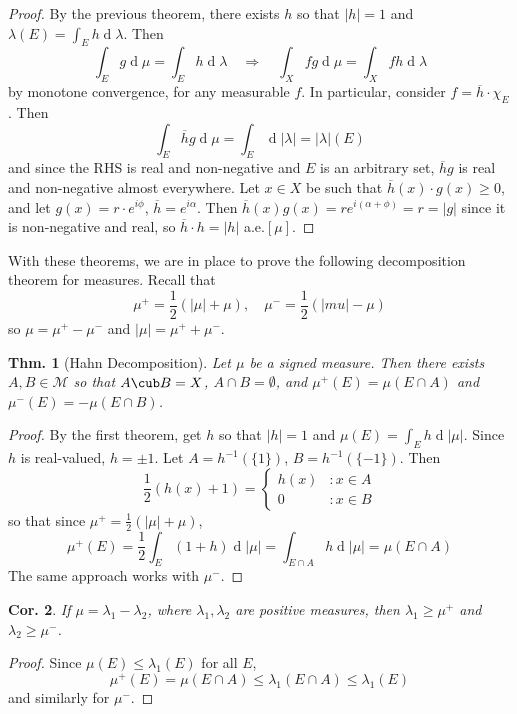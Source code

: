 \documentclass[12pt, a4paper]{book}
\renewcommand{\d}[1]{\ensuremath{\operatorname{d}\!{#1}}} %
\newcommand{\imp}{\ensuremath{\quad\Longrightarrow\quad}}
\newtheorem{theorem}{Thm.}[section]
\newtheorem{corollary}[theorem]{Cor.}
\theoremstyle{nonumberplain}
\newtheorem{proof}{Proof}
\begin{document}
\begin{proof}
    By the previous theorem, there exists $h$ so that $|h|=1$ and $\lambda(E)=\int_Eh\d{\lambda}$.
    Then
    \[\int_E g\d{\mu}=\int_E h\d{\lambda}\imp \int_X fg\d{\mu}=\int_X fh\d{\lambda}\]
    by monotone convergence, for any measurable $f$.
    In particular, consider $f=\overline{h}\cdot \chi_E$.
    Then
    \[\int_E\overline{h}g\d{\mu}=\int_E\d{|\lambda|}=|\lambda|(E)\]
    and since the RHS is real and non-negative and $E$ is an arbitrary set, $\overline{h}g$ is real and non-negative almost everywhere.
    Let $x\in X$ be such that $\overline{h}(x)\cdot g(x)\geq 0$, and let $g(x)=r\cdot e^{i\phi}$, $\overline{h}=e^{i\alpha}$.
    Then $\overline{h}(x)g(x)=re^{i(\alpha+\phi)}=r=|g|$ since it is non-negative and real, so $\overline{h}\cdot h=|h|$ a.e.$[\mu]$.
\end{proof}
With these theorems, we are in place to prove the following decomposition theorem for measures.
Recall that
\[\mu^+=\frac{1}{2}(|\mu|+\mu),\quad\mu^-=\frac{1}{2}(|mu|-\mu)\]
so $\mu=\mu^+-\mu^-$ and $|\mu|=\mu^++\mu^-$.
\begin{theorem}[Hahn Decomposition]
    Let $\mu$ be a signed measure.
    Then there exists $A,B\in\mathcal{M}$ so that $A\cub B=X$, $A\cap B=\emptyset$, and $\mu^+(E)=\mu(E\cap A)$ and $\mu^-(E)=-\mu(E\cap B)$.
\end{theorem}
\begin{proof}
    By the first theorem, get $h$ so that $|h|=1$ and $\mu(E)=\int_E h\d{|\mu|}$.
    Since $h$ is real-valued, $h=\pm 1$.
    Let $A=h^{-1}(\{1\})$, $B=h^{-1}(\{-1\})$.
    Then
    \[\frac{1}{2}(h(x)+1)=
        \begin{cases}
            h(x) &: x\in A\\
            0 &: x\in B
        \end{cases}
    \]
    so that since $\mu^+=\frac{1}{2}(|\mu|+\mu)$,
    \[\mu^+(E)=\frac{1}{2}\int_E(1+h)\d{|\mu|}=\int_{E\cap A} h\d{|\mu|}=\mu(E\cap A)\]
    The same approach works with $\mu^-$.
\end{proof}
\begin{corollary}
    If $\mu=\lambda_1-\lambda_2$, where $\lambda_1,\lambda_2$ are positive measures, then $\lambda_1\geq\mu^+$ and $\lambda_2\geq\mu^-$.
\end{corollary}
\begin{proof}
    Since $\mu(E)\leq\lambda_1(E)$ for all $E$,
    \begin{equation*}\mu^+(E)=\mu(E\cap A)\leq\lambda_1(E\cap A)\leq\lambda_1(E)\end{equation*}
    and similarly for $\mu^-$.
\end{proof}
\end{document}
